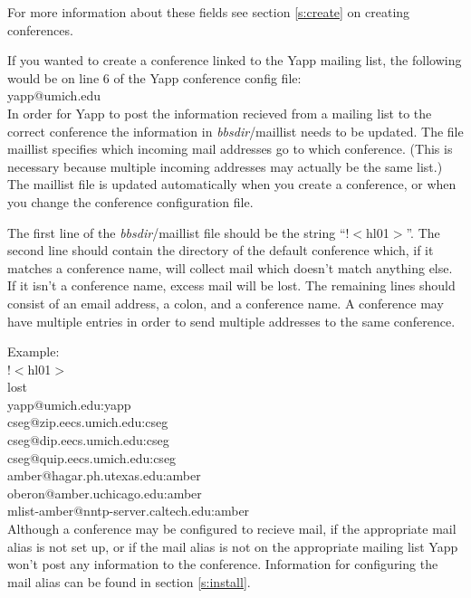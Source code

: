 \documentclass[twoside]{report}
\begin{document}
      For more information about these fields see section \ref{s:create} on 
      creating conferences.
   
      If you wanted to create a conference linked to the Yapp mailing list,
      the following would be on line 6 of the Yapp conference config file:\\
   
        {\centering yapp@umich.edu} \\
  
      In order for Yapp to post the information recieved from a mailing list
      to the correct conference the information in {\em bbsdir}/maillist
      needs to be updated. The file maillist specifies
      which incoming mail addresses go to which conference.  (This is necessary
      because multiple incoming addresses may actually be the same list.) 
      The maillist file is updated automatically when you create a conference,
      or when you change the conference configuration file.
   
      The first line of the {\em bbsdir}/maillist file should 
      be the string ``!$<$hl01$>$''.
      The second line should contain the directory of the default conference
      which, if it matches a conference name, will collect mail which doesn't
      match anything else.  If it isn't a conference name, excess mail will
      be lost. The remaining lines should consist of an email address, 
      a colon, and a conference name.  A conference may have multiple entries 
      in order to send multiple addresses to the same conference.
   
      Example:\\
      \qquad   !$<$hl01$>$\\
      \qquad  lost\\
      \qquad   yapp@umich.edu:yapp\\
      \qquad   cseg@zip.eecs.umich.edu:cseg\\
      \qquad   cseg@dip.eecs.umich.edu:cseg\\
      \qquad   cseg@quip.eecs.umich.edu:cseg\\
      \qquad   amber@hagar.ph.utexas.edu:amber\\
      \qquad   oberon@amber.uchicago.edu:amber\\
      \qquad   mlist-amber@nntp-server.caltech.edu:amber\\
  

      Although a conference may be configured to recieve mail, if 
      the appropriate mail alias is not set up, or if the mail alias
      is not on the appropriate mailing list Yapp won't
      post any information to the conference.  Information for 
      configuring the mail alias can be found in section \ref{s:install}.
      
\end{document}
